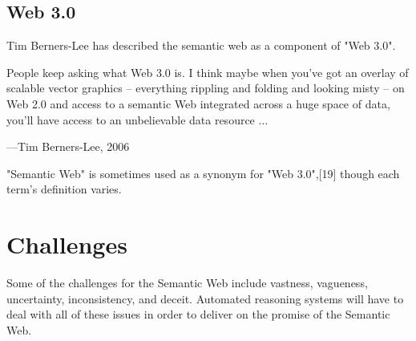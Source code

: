 \subsection{Web 3.0}

Tim Berners-Lee has described the semantic web as a component of "Web 3.0".

People keep asking what Web 3.0 is. I think maybe when you've got an overlay of scalable vector graphics – everything rippling and folding and looking misty – on Web 2.0 and access to a semantic Web integrated across a huge space of data, you'll have access to an unbelievable data resource ...

\begin{flushright}
—Tim Berners-Lee, 2006
\end{flushright}

"Semantic Web" is sometimes used as a synonym for "Web 3.0",[19] though each term's definition varies.



\section{Challenges}

Some of the challenges for the Semantic Web include vastness, vagueness, uncertainty, inconsistency, and deceit. Automated reasoning systems will have to deal with all of these issues in order to deliver on the promise of the Semantic Web.

